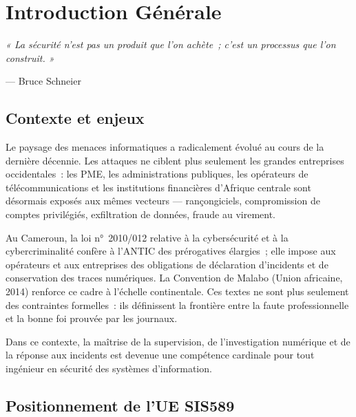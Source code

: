 \chapter*{Introduction Générale}
\label{chap:intro}

\epigraph{%
  \itshape « La sécurité n'est pas un produit que l'on achète~;
  c'est un processus que l'on construit. »
}{--- Bruce Schneier}

\section*{Contexte et enjeux}

Le paysage des menaces informatiques a radicalement évolué au cours de la dernière
décennie. Les attaques ne ciblent plus seulement les grandes entreprises
occidentales~: les PME, les administrations publiques, les opérateurs de
télécommunications et les institutions financières d'Afrique centrale sont
désormais exposés aux mêmes vecteurs — rançongiciels, compromission de
comptes privilégiés, exfiltration de données, fraude au virement.

Au Cameroun, la loi n°~2010/012 relative à la cybersécurité et à la
cybercriminalité confère à l'ANTIC des prérogatives élargies~; elle impose
aux opérateurs et aux entreprises des obligations de déclaration d'incidents
et de conservation des traces numériques. La Convention de Malabo (Union
africaine, 2014) renforce ce cadre à l'échelle continentale. Ces textes ne
sont plus seulement des contraintes formelles~: ils définissent la frontière
entre la faute professionnelle et la bonne foi prouvée par les journaux.

Dans ce contexte, la maîtrise de la supervision, de l'investigation numérique
et de la réponse aux incidents est devenue une compétence cardinale pour
tout ingénieur en sécurité des systèmes d'information.

\section*{Positionnement de l'UE SIS589}

